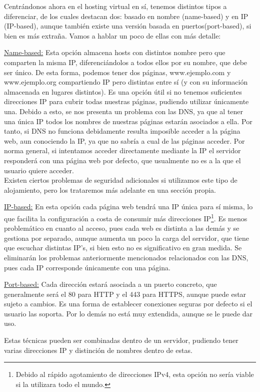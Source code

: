 \documentclass[a4paper, 10pt]{article} %
\begin{document}
Centrándonos ahora en el hosting virtual en sí, tenemos distintos tipos a diferenciar, de los cuales destacan dos: basado en nombre (name-based) y en IP (IP-based), aunque también existe una versión basada en puertos(port-based), si bien es más extraña. Vamos a hablar un poco de ellas con más detalle: 

\underline{Name-based:} Esta opción almacena hosts con distintos nombre pero que comparten la misma IP, diferenciándolos a todos ellos por su nombre, que debe ser único. De esta forma, podemos tener dos páginas, www.ejemplo.com y www.ejemplo.org compartiendo IP pero distintas entre sí (y con su información almacenada en lugares distintos). Es una opción útil si no tenemos suficientes direcciones IP para cubrir todas nuestras páginas, pudiendo utilizar únicamente una. Debido a esto, se nos presenta un problema con las DNS, ya que al tener una única IP todos los nombres de nuestras páginas estarán asociados a ella. Por tanto, si DNS no funciona debidamente resulta imposible acceder a la página web, aun conociendo la IP, ya que no sabría a cual de las páginas acceder. Por norma general, si intentamos acceder directamente mediante la IP el servidor responderá con una página web por defecto, que usualmente no es a la que el usuario quiere acceder. \\
Existen ciertos problemas de seguridad adicionales si utilizamos este tipo de alojamiento, pero los trataremos más adelante en una sección propia. 

\underline{IP-based:} En esta opción cada página web tendrá una IP única para sí misma, lo que facilita la configuración a costa de consumir más direcciones IP\footnote{Debido al rápido agotamiento de direcciones IPv4, esta opción no sería viable si la utilizara todo el mundo.}. Es menos problemático en cuanto al acceso, pues cada web es distinta a las demás y se gestiona por separado, aunque aumenta un poco la carga del servidor, que tiene que escuchar distintas IP's, si bien esto no es significativo en gran medida. Se eliminarán los problemas anteriormente mencionados relacionados con las DNS, pues cada IP corresponde únicamente con una página. 

\underline{Port-based:} Cada dirección estará asociada a un puerto concreto, que generalmente será el 80 para HTTP y el 443 para HTTPS, aunque puede estar sujeto a cambios. Es una forma de establecer conexiones seguras por defecto si el usuario las soporta. Por lo demás no está muy extendida, aunque se le puede dar uso. 

Estas técnicas pueden ser combinadas dentro de un servidor, pudiendo tener varias direcciones IP y distinción de nombres dentro de estas.  
\end{document}
